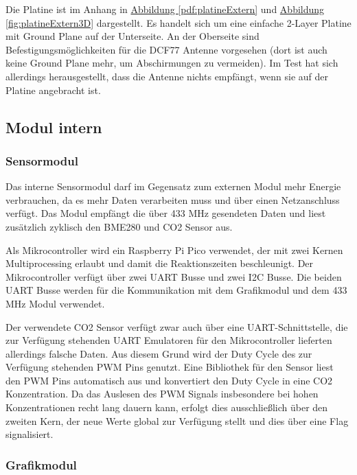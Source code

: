 \documentclass[a4paper,11pt]{article}
\newcounter{subsubsubsection}[subsubsection]
\begin{document}
\label{subsubsubsub:platineExtern}

Die Platine ist im Anhang in \hyperref[pdf:platineExtern]{Abbildung \ref{pdf:platineExtern}} und \hyperref[fig:platineExtern3D]{Abbildung \ref{fig:platineExtern3D}} dargestellt. Es handelt sich um eine einfache 2-Layer Platine mit Ground Plane
auf der Unterseite. An der Oberseite sind Befestigungsmöglichkeiten für die DCF77 Antenne vorgesehen (dort ist auch keine Ground Plane mehr, um Abschirmungen zu vermeiden). 
Im Test hat sich allerdings herausgestellt, dass die Antenne nichts empfängt, wenn sie auf der Platine angebracht ist. 

\newpage
\subsection{Modul intern}
\label{subsub:modulInt}

\subsubsection{Sensormodul}
\label{subsubsub:sensormodulInt}

Das interne Sensormodul darf im Gegensatz zum externen Modul mehr Energie verbrauchen, da es mehr Daten verarbeiten muss und über einen Netzanschluss verfügt. 
Das Modul empfängt die über 433 MHz gesendeten Daten und liest zusätzlich zyklisch den BME280 und CO2 Sensor aus.

\vspace{0.3cm}
\noindent
Als Mikrocontroller wird ein Raspberry Pi Pico verwendet, der mit zwei Kernen Multiprocessing erlaubt und damit die Reaktionszeiten beschleunigt. Der Mikrocontroller
verfügt über zwei UART Busse und zwei I2C Busse. Die beiden UART Busse werden für die Kommunikation mit dem Grafikmodul und dem 433 MHz Modul verwendet.

Der verwendete CO2 Sensor verfügt zwar auch über eine UART-Schnittstelle, die zur Verfügung stehenden UART Emulatoren für den Mikrocontroller lieferten allerdings
falsche Daten. Aus diesem Grund wird der Duty Cycle des zur Verfügung stehenden PWM Pins genutzt. 
Eine Bibliothek für den Sensor liest den PWM Pins automatisch aus und konvertiert den Duty Cycle in eine CO2 Konzentration. Da das Auslesen des PWM Signals insbesondere bei hohen
Konzentrationen recht lang dauern kann, erfolgt dies ausschließlich über den zweiten Kern, der neue Werte global zur Verfügung stellt und dies über eine Flag signalisiert. 

\subsubsection{Grafikmodul}
\label{subsubsub:grafikmodulInt}
\end{document}
